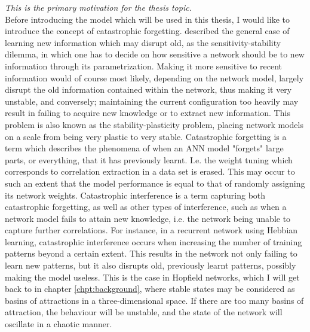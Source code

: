 \textit{This is the primary motivation for the thesis topic.}
\\

Before introducing the model which will be used in this thesis, I would like to introduce the concept of catastrophic forgetting.
\cite{Hebb1949} described the general case of learning new information which may disrupt old, as the sensitivity-stability dilemma, in which one has to decide on how sensitive a network should be to new information through its parametrization. Making it more sensitive to recent information would of course most likely, depending on the network model, largely disrupt the old information contained within the network, thus making it very unstable, and conversely; maintaining the current configuration too heavily may result in failing to acquire new knowledge or to extract new information. This problem is also known as the stability-plasticity \citep{Carpenter1987} problem, placing network models on a scale from being very plastic to very stable.
Catastrophic forgetting \citep{McCloskey1989, Ratcliff1990} is a term which describes the phenomena of when an ANN model "forgets" large parts, or everything, that it has previously learnt. I.e. the weight tuning which corresponds to correlation extraction in a data set is erased. This may occur to such an extent that the model performance is equal to that of randomly assigning its network weights. Catastrophic interference is a term capturing both catastrophic forgetting, as well as other types of interference, such as when a network model fails to attain new knowledge, i.e. the network being unable to capture further correlations. For instance, in a recurrent network using Hebbian learning, catastrophic interference occurs when increasing the number of training patterns beyond a certain extent. This results in the network not only failing to learn new patterns, but it also disrupts old, previously learnt patterns, possibly making the model useless. This is the case in Hopfield networks, which I will get back to in chapter \ref{chpt:background}, where stable states may be considered as basins of attractions in a three-dimensional space. If there are too many basins of attraction, the behaviour will be unstable, and the state of the network will oscillate in a chaotic manner.
